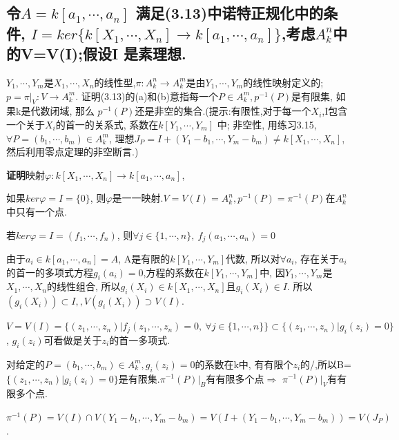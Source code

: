 \documentclass[UTF8]{book}
\begin{document}
	
	
	\subsection{令$A=k[a_{1}, \cdots , a_{n}]$ 满足(3.13)中诺特正规化中的条件, $I=ker\{k[X_{1}, \cdots , X_{n}]\rightarrow k[a_{1}, \cdots , a_{n}]\}$,考虑$A^{n}_{k}$中的V=V(I);假设I 是素理想.}
	
	$Y_{1}, \cdots , Y_{m}$是$X_{1}, \cdots , X_{n}$的线性型,$ \pi :A^{n}_{k}\rightarrow A^{m}_{k}$是由$Y_{1}, \cdots , Y_{m}$的线性映射定义的;$p=\pi \vert_{V}:V\rightarrow A^{m}_{k}$. 证明(3.13)的(a)和(b)意指每一个$P\in A^{m}_{k}, p^{-1}(P)$是有限集, 如果k是代数闭域, 那么 $p^{-1}(P)$还是非空的集合.(提示:有限性,对于每一个$X_{i}$,I包含一个关于$X_{i}$的首一的关系式, 系数在$k[Y_{1}, \cdots , Y_{m}]$ 中; 非空性, 用练习3.15,$\forall P=(b_{1}, \cdots , b_{m})\in A^{m}_{k}$, 理想$J_{P}=I+(Y_{1}-b_{1}, \cdots , Y_{m}-b_{m})\neq k[X_{1}, \cdots , X_{n}]$, 然后利用零点定理的非空断言.)
	
	\textbf{证明}映射$\varphi :k[X_{1}, \cdots , X_{n}]\rightarrow k[a_{1}, \cdots , a_{n}]$,
	
	如果$ker \varphi=I=\{0\}$, 则$\varphi $是一一映射.$V=V(I)=A^{n}_{k}, p^{-1}(P)=\pi^{-1}(P)$在$A^{n}_{k}$中只有一个点.
	
	若$ker\varphi=I=(f_{1}, \cdots , f_{n})$, 则$\forall j\in \{1, \cdots , n\}, \ f_{j}(a_{1}, \cdots , a_{n})=0$
	
	由于$a_{i}\in k[a_{1}, \cdots , a_{n}]=A$, A是有限的$k[Y_{1}, \cdots , Y_{m}]$代数, 所以对$\forall a_{i}$, 存在关于$a_{i}$的首一的多项式方程$g_{i}(a_{i})=0$,方程的系数在$k[Y_{1}, \cdots , Y_{m}]$中, 因$Y_{1}, \cdots , Y_{m}$是$X_{1}, \cdots , X_{n}$的线性组合, 所以$g_{i}(X_{i})\in k[X_{1}, \cdots , X_{n}]$且$g_{i}(X_{i})\in I$. 所以$(g_{i}(X_{i}))\subset I, , V(g_{i}(X_{i}))\supset V(I).$
	
	$V=V(I)=\{(z_{1}, \cdots , z_{n})\vert f_{j}(z_{1}, \cdots , z_{n})=0, \ \forall j\in \{1, \cdots , n\}\}\subset \{(z_{1}, \cdots , z_{n})\vert g_{i}(z_{i})=0 \}$,  $g_{i}(z_{i})$可看做是关于$z_{i}$的首一多项式.
	
	对给定的$P=(b_{1}, \cdots , b_{m})\in A^{m}_{k},g_{i}(z_{i})=0$的系数在k中, 有有限个$z_{i}$的/,所以B=$\{(z_{1}, \cdots , z_{n})\vert g_{i}(z_{i})=0 \}$是有限集.$\pi^{-1}(P)\vert_{B}$有有限多个点$\Rightarrow$ $\pi^{-1}(P)\vert_{V}$有有限多个点.
	
	$\pi^{-1}(P)=V(I)\cap V(Y_{1}-b_{1}, \cdots , Y_{m}-b_{m})=V(I+(Y_{1}-b_{1}, \cdots , Y_{m}-b_{m}))=V(J_{P})$.
	
\end{document}
